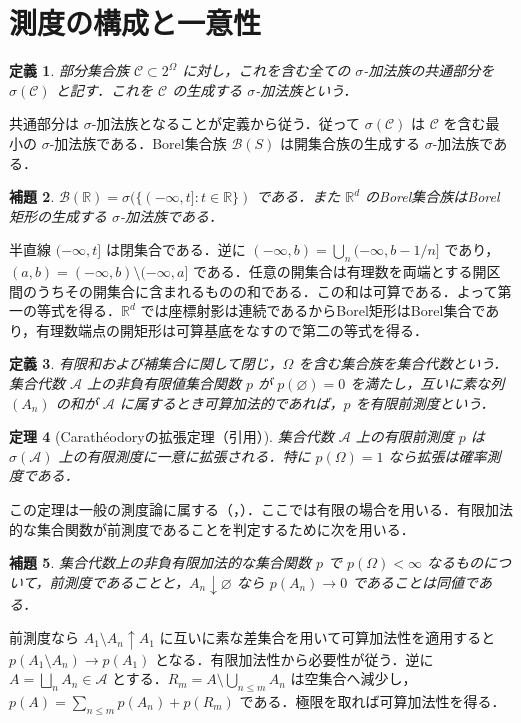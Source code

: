 \documentclass[a5paper,10pt,onecolumn]{jsarticle}
\makeatletter
\theoremstyle{mathnotetheorem}
\newtheorem{theorem}{定理}[section]
\newtheorem{definition}[theorem]{定義}
\newtheorem{lemma}[theorem]{補題}
\renewcommand{\proofname}{証明}
\renewenvironment{proof}[1][\proofname]{%
  \par\pushQED{\qed}\normalfont\topsep4\p@\@plus2\p@\relax
  \trivlist\item[\hskip\labelsep\bfseries #1]\ignorespaces
}{\popQED\endtrivlist\@endpefalse}
\newcommand{\R}{\mathbb{R}}
\newcommand{\B}{\mathcal B}
\newcommand{\1}{\mathbf{1}}
\makeatother
\begin{document}
\section{測度の構成と一意性}
\begin{definition}
部分集合族 $\mathcal C\subset 2^\Omega$ に対し，これを含む全ての $\sigma$-加法族の共通部分を $\sigma(\mathcal C)$ と記す．これを $\mathcal C$ の生成する $\sigma$-加法族という．
\end{definition}
共通部分は $\sigma$-加法族となることが定義から従う．従って $\sigma(\mathcal C)$ は $\mathcal C$ を含む最小の $\sigma$-加法族である．Borel集合族 $\B(S)$ は開集合族の生成する $\sigma$-加法族である．
\begin{lemma}\label{borel}
$\B(\R)=\sigma(\{(-\infty,t]:t\in\R\})$ である．また $\R^d$ のBorel集合族はBorel矩形の生成する $\sigma$-加法族である．
\end{lemma}
\begin{proof}
半直線 $(-\infty,t]$ は閉集合である．逆に $(-\infty,b)=\bigcup_n(-\infty,b-1/n]$ であり，$(a,b)=(-\infty,b)\setminus(-\infty,a]$ である．任意の開集合は有理数を両端とする開区間のうちその開集合に含まれるものの和である．この和は可算である．よって第一の等式を得る．$\R^d$ では座標射影は連続であるからBorel矩形はBorel集合であり，有理数端点の開矩形は可算基底をなすので第二の等式を得る．
\end{proof}
\begin{definition}
有限和および補集合に関して閉じ，$\Omega$ を含む集合族を集合代数という．集合代数 $\mathcal A$ 上の非負有限値集合関数 $p$ が $p(\varnothing)=0$ を満たし，互いに素な列 $(A_n)$ の和が $\mathcal A$ に属するとき可算加法的であれば，$p$ を有限前測度という．
\end{definition}
\begin{theorem}[Carath\'eodoryの拡張定理（引用）]\label{cara}
集合代数 $\mathcal A$ 上の有限前測度 $p$ は $\sigma(\mathcal A)$ 上の有限測度に一意に拡張される．特に $p(\Omega)=1$ なら拡張は確率測度である．
\end{theorem}
この定理は一般の測度論に属する（\cite[Appendix A.1]{durrett}，\cite[\S1.5]{bog}）．ここでは有限の場合を用いる．有限加法的な集合関数が前測度であることを判定するために次を用いる．
\begin{lemma}\label{pre}
集合代数上の非負有限加法的な集合関数 $p$ で $p(\Omega)<\infty$ なるものについて，前測度であることと，$A_n\downarrow\varnothing$ なら $p(A_n)\to0$ であることは同値である．
\end{lemma}
\begin{proof}
前測度なら $A_1\setminus A_n\uparrow A_1$ に互いに素な差集合を用いて可算加法性を適用すると $p(A_1\setminus A_n)\to p(A_1)$ となる．有限加法性から必要性が従う．逆に $A=\bigsqcup_nA_n\in\mathcal A$ とする．$R_m=A\setminus\bigcup_{n\le m}A_n$ は空集合へ減少し，$p(A)=\sum_{n\le m}p(A_n)+p(R_m)$ である．極限を取れば可算加法性を得る．
\end{proof}
\end{document}
